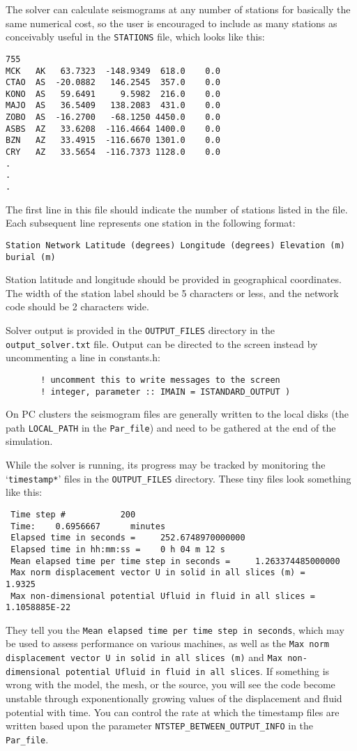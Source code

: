 \documentclass[onecolumn]{article}
\begin{document}
The solver can calculate seismograms at any number of stations for
basically the same numerical cost, so the user is encouraged to
include as many stations as conceivably useful in the \texttt{STATIONS} file,
which looks like this:
\begin{verbatim}
755
MCK   AK   63.7323  -148.9349  618.0    0.0
CTAO  AS  -20.0882   146.2545  357.0    0.0
KONO  AS   59.6491     9.5982  216.0    0.0
MAJO  AS   36.5409   138.2083  431.0    0.0
ZOBO  AS  -16.2700   -68.1250 4450.0    0.0
ASBS  AZ   33.6208  -116.4664 1400.0    0.0
BZN   AZ   33.4915  -116.6670 1301.0    0.0
CRY   AZ   33.5654  -116.7373 1128.0    0.0
.
.
.
\end{verbatim}
The first line in this file should indicate the number of stations listed
in the file.
Each subsequent line represents one station in the following format:
\begin{verbatim}
Station Network Latitude (degrees) Longitude (degrees) Elevation (m) burial (m)
\end{verbatim}
Station latitude and longitude should be provided in geographical coordinates.
The width of the station label should be 5 characters or less,
and the network code should be 2 characters wide.

Solver output is provided in the \texttt{OUTPUT\_FILES} directory in
the \texttt{output\_solver.txt} file.
Output can be directed to the screen instead by uncommenting a line in constants.h:
\begin{verbatim}
       ! uncomment this to write messages to the screen
       ! integer, parameter :: IMAIN = ISTANDARD_OUTPUT )
\end{verbatim}
On PC clusters the seismogram files are generally written to the
local disks (the path \texttt{LOCAL\_PATH} in the \texttt{Par\_file})
and need to be gathered at the end of the simulation.

While the solver is running, its progress may be tracked by monitoring the
`\texttt{timestamp*}' files in the \texttt{OUTPUT\_FILES} directory.
These tiny files look something like this:
\begin{verbatim}
 Time step #           200
 Time:    0.6956667      minutes
 Elapsed time in seconds =     252.6748970000000
 Elapsed time in hh:mm:ss =    0 h 04 m 12 s
 Mean elapsed time per time step in seconds =     1.263374485000000
 Max norm displacement vector U in solid in all slices (m) =       1.9325
 Max non-dimensional potential Ufluid in fluid in all slices =    1.1058885E-22
\end{verbatim}
They tell you the \texttt{Mean elapsed time per time step in seconds},
which may be used to assess performance on various machines,
as well as the \texttt{Max norm displacement vector U in solid in all slices (m)}
and
\texttt{Max non-dimensional potential Ufluid in fluid in all slices}.
If something is wrong with the model, the mesh, or the source, you will
see the code become unstable through exponentionally growing
values of the displacement and fluid potential with time.
You can control the rate at which the timestamp files are written
based upon the parameter \texttt{NTSTEP\_BETWEEN\_OUTPUT\_INFO}
in the \texttt{Par\_file}.
\end{document}
